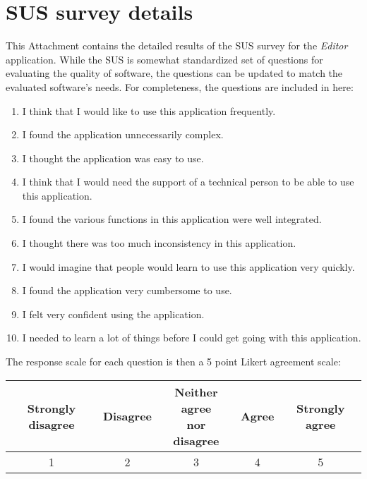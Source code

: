 \documentclass[12pt,a4paper]{report}
\begin{document}
	\section{SUS survey details}
	\label{sec:sussurvey}
	This Attachment contains the detailed results of the \ac{SUS} survey for the \textit{Editor} application.
	While the \ac{SUS} is somewhat standardized set of questions for evaluating the quality of software,
	the questions can be updated to match the evaluated software's needs. For completeness, the questions are included in here:
	\begin{enumerate}
		\item I think that I would like to use this application frequently.
		\item I found the application unnecessarily complex.
		\item I thought the application was easy to use.
		\item I think that I would need the support of a technical person to be able to use this application.
		\item I found the various functions in this application were well integrated.
		\item I thought there was too much inconsistency in this application.
		\item I would imagine that people would learn to use this application very quickly.
		\item I found the application very cumbersome to use.
		\item I felt very confident using the application.
		\item I needed to learn a lot of things before I could get going with this application.
	\end{enumerate}
\smallskip
	The response scale for each question is then a 5 point Likert agreement scale:
	\begin{center}
	\begin{tabular}{c | c | c | c | c}
		Strongly disagree &	Disagree & \makecell{Neither agree\\ nor disagree} & Agree & Strongly agree \\
		\hline
1 & 2 & 3 & 4 & 5 \\
	\end{tabular}
	\end{center}
\end{document}
